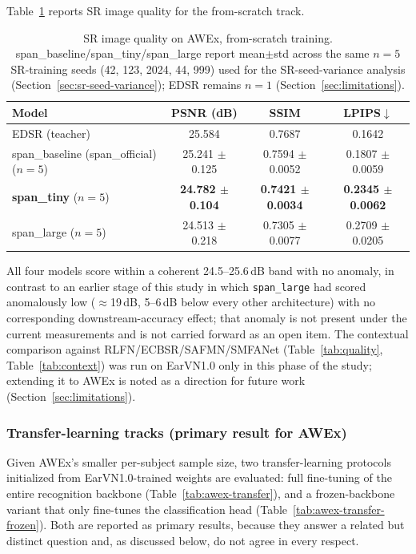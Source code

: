 \documentclass[11pt]{article}
\begin{document}
Table~\ref{tab:awex-quality} reports SR image quality for the from-scratch track.

\begin{table}[H]
\centering
\caption{SR image quality on AWEx, from-scratch training. span\_baseline/span\_tiny/span\_large report mean$\pm$std across the same $n=5$ SR-training seeds (42, 123, 2024, 44, 999) used for the SR-seed-variance analysis (Section~\ref{sec:sr-seed-variance}); EDSR remains $n=1$ (Section~\ref{sec:limitations}).}
\label{tab:awex-quality}
\begin{tabular}{lccc}
\toprule
Model & PSNR (dB) & SSIM & LPIPS$\downarrow$ \\
\midrule
EDSR (teacher)                           & 25.584 & 0.7687 & 0.1642 \\
span\_baseline (span\_official) ($n=5$)  & 25.241 $\pm$ 0.125 & 0.7594 $\pm$ 0.0052 & 0.1807 $\pm$ 0.0059 \\
\textbf{span\_tiny} ($n=5$)              & \textbf{24.782 $\pm$ 0.104} & \textbf{0.7421 $\pm$ 0.0034} & \textbf{0.2345 $\pm$ 0.0062} \\
span\_large ($n=5$)                      & 24.513 $\pm$ 0.218 & 0.7305 $\pm$ 0.0077 & 0.2709 $\pm$ 0.0205 \\
\bottomrule
\end{tabular}
\end{table}
All four models score within a coherent 24.5--25.6\,dB band with no anomaly, in contrast to an earlier stage of this study in which \texttt{span\_large} had scored anomalously low ($\approx$19\,dB, 5--6\,dB below every other architecture) with no corresponding downstream-accuracy effect; that anomaly is not present under the current measurements and is not carried forward as an open item. The contextual comparison against RLFN/ECBSR/SAFMN/SMFANet (Table~\ref{tab:quality}, Table~\ref{tab:context}) was run on EarVN1.0 only in this phase of the study; extending it to AWEx is noted as a direction for future work (Section~\ref{sec:limitations}).

\subsubsection{Transfer-learning tracks (primary result for AWEx)}
\label{sec:res-awex-transfer}

Given AWEx's smaller per-subject sample size, two transfer-learning protocols initialized from EarVN1.0-trained weights are evaluated: full fine-tuning of the entire recognition backbone (Table~\ref{tab:awex-transfer}), and a frozen-backbone variant that only fine-tunes the classification head (Table~\ref{tab:awex-transfer-frozen}). Both are reported as primary results, because they answer a related but distinct question and, as discussed below, do not agree in every respect.
\end{document}
